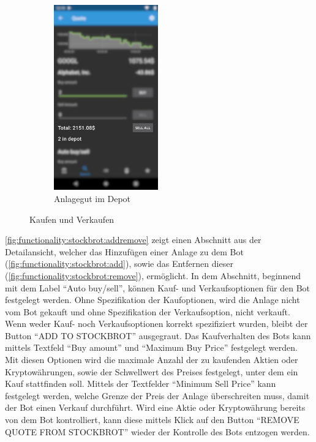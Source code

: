 \documentclass[a4paper]{article}
\begin{document}
\begin{figure}[H]
\begin{subfigure}{.5\textwidth}
		\centering
		\includegraphics[height=8cm,keepaspectratio]{./images/quote/in_depot.png}
		\caption{Anlagegut im Depot}
		\label{fig:functionality:buy-sell:in-depot}
	\end{subfigure}
	\caption{Kaufen und Verkaufen}
	\label{fig:functionality:buy-sell}
\end{figure}

\autoref{fig:functionality:stockbrot:addremove} zeigt einen Abschnitt aus der Detailansicht, welcher das Hinzufügen einer Anlage zu dem Bot (\autoref{fig:functionality:stockbrot:add}), sowie das Entfernen dieser (\autoref{fig:functionality:stockbrot:remove}), ermöglicht. In dem Abschnitt, beginnend mit dem Label "`Auto buy/sell"', können Kauf- und Verkaufsoptionen für den Bot festgelegt werden. Ohne Spezifikation der Kaufoptionen, wird die Anlage nicht vom Bot gekauft und ohne Spezifikation der Verkaufsoption, nicht verkauft. Wenn weder Kauf- noch Verkaufsoptionen korrekt spezifiziert wurden, bleibt der Button "`ADD TO STOCKBROT"' ausgegraut. Das Kaufverhalten des Bots kann mittels Textfeld "`Buy amount"' und "`Maximum Buy Price"' festgelegt werden. Mit diesen Optionen wird die maximale Anzahl der zu kaufenden Aktien oder Kryptowährungen, sowie der Schwellwert des Preises festgelegt, unter dem ein Kauf stattfinden soll. Mittels der Textfelder "`Minimum Sell Price"' kann festgelegt werden, welche Grenze der Preis der Anlage überschreiten muss, damit der Bot einen Verkauf durchführt. Wird eine Aktie oder Kryptowährung bereits von dem Bot kontrolliert, kann diese mittels Klick auf den Button "`REMOVE QUOTE FROM STOCKBROT"' wieder der Kontrolle des Bots entzogen werden.
\end{document}
